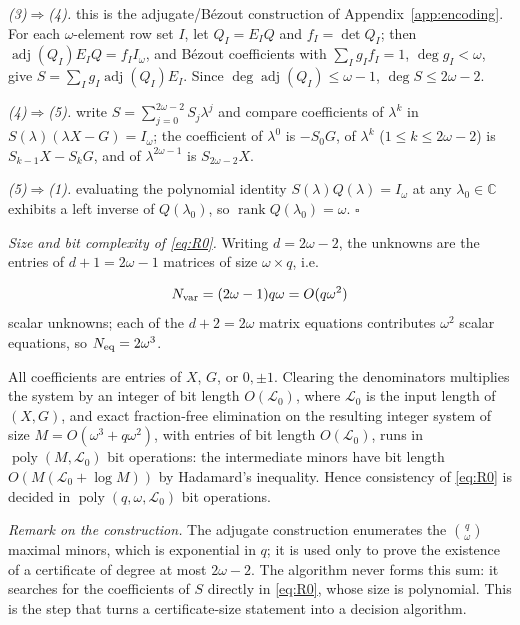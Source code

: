 \documentclass[journal]{IEEEtran}
\theoremstyle{plainn}
\begin{document}
\emph{(3)$\Rightarrow$(4).} this is the adjugate/B\'ezout construction of Appendix~\ref{app:encoding}. For each $\omega$-element row set $I$, let $Q_I=E_IQ$ and $f_I=\det Q_I$; then $\operatorname{adj}(Q_I)E_IQ=f_II_\omega$, and B\'ezout coefficients with $\sum_Ig_If_I=1$, $\deg g_I<\omega$, give $S=\sum_Ig_I\operatorname{adj}(Q_I)E_I$. Since $\deg\operatorname{adj}(Q_I)\le\omega-1$, $\deg S\le2\omega-2$.

\emph{(4)$\Rightarrow$(5).} write $S=\sum_{j=0}^{2\omega-2}S_j\lambda^j$ and compare coefficients of $\lambda^k$ in $S(\lambda)(\lambda X-G)=I_\omega$; the coefficient of $\lambda^0$ is $-S_0G$, of $\lambda^k$ ($1\le k\le2\omega-2$) is $S_{k-1}X-S_kG$, and of $\lambda^{2\omega-1}$ is $S_{2\omega-2}X$.

\emph{(5)$\Rightarrow$(1).} evaluating the polynomial identity $S(\lambda)Q(\lambda)=I_\omega$ at any $\lambda_0\in\mathbb C$ exhibits a left inverse of $Q(\lambda_0)$, so $\operatorname{rank}Q(\lambda_0)=\omega$. $\square$

\emph{Size and bit complexity of \eqref{eq:R0}.} Writing $d=2\omega-2$, the unknowns are the entries of $d+1=2\omega-1$ matrices of size $\omega\times q$, i.e.

\begin{equation}
N_{\rm var}=(2\omega-1)q\omega=O(q\omega^2)
\end{equation}
scalar unknowns; each of the $d+2=2\omega$ matrix equations contributes $\omega^2$ scalar equations, so $N_{\rm eq}=2\omega^3$.

All coefficients are entries of $X$, $G$, or $0,\pm1$. Clearing the denominators multiplies the system by an integer of bit length $O(\mathcal L_0)$, where $\mathcal L_0$ is the input length of $(X,G)$, and exact fraction-free elimination on the resulting integer system of size $M=O(\omega^3+q\omega^2)$, with entries of bit length $O(\mathcal L_0)$, runs in $\operatorname{poly}(M,\mathcal L_0)$ bit operations: the intermediate minors have bit length $O(M(\mathcal L_0+\log M))$ by Hadamard's inequality. Hence consistency of \eqref{eq:R0} is decided in $\operatorname{poly}(q,\omega,\mathcal L_0)$ bit operations.

\emph{Remark on the construction.} The adjugate construction enumerates the $\binom q\omega$ maximal minors, which is exponential in $q$; it is used only to prove the existence of a certificate of degree at most $2\omega-2$. The algorithm never forms this sum: it searches for the coefficients of $S$ directly in \eqref{eq:R0}, whose size is polynomial. This is the step that turns a certificate-size statement into a decision algorithm.
\end{document}
